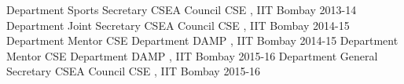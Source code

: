 \begin{cvhonors}
  \cvhonor
    {Department Sports Secretary}
    {CSEA Council}
    {CSE , IIT Bombay}
    {2013-14}
  \cvhonor
    {Department Joint Secretary}
    {CSEA Council}
    {CSE , IIT Bombay}
    {2014-15}
  \cvhonor
    {Department Mentor}
    {CSE Department}
    {DAMP , IIT Bombay}
    {2014-15}
   \cvhonor
    {Department Mentor}
    {CSE Department}
    {DAMP , IIT Bombay}
    {2015-16}
  \cvhonor
    {Department General Secretary}
    {CSEA Council}
    {CSE , IIT Bombay}
    {2015-16}
\end{cvhonors}
